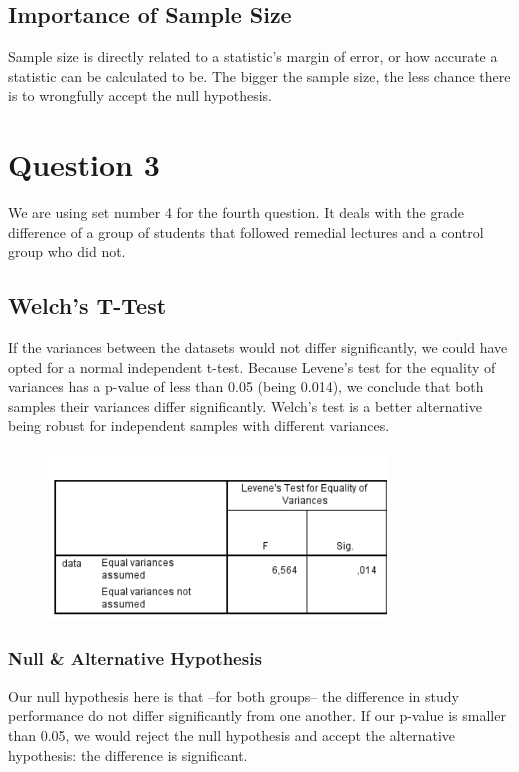 \documentclass[14]{article}
\begin{document}
\subsection{Importance of Sample Size}
Sample size is directly related to a statistic's margin of error, or how accurate a statistic can be calculated to be. The bigger the sample size, the less chance there is to wrongfully accept the null hypothesis. 

\section{Question 3}
We are using set number 4 for the fourth question. It deals with the grade difference of a group of students that followed remedial lectures and a control group who did not.

\subsection{Welch's T-Test}
If the variances between the datasets would not differ significantly, we could have opted for a normal independent t-test. Because Levene's test for the equality of variances has a p-value of less than 0.05 (being 0.014), we conclude that both samples their variances differ significantly. Welch's test is a better alternative being robust for independent samples with different variances.

\begin{figure}[!htb]
	\includegraphics[width=0.8\textwidth]{img/question3/Levene.PNG}
	\captionsetup{width=1.0\textwidth}
	\centering 
\end{figure}

\subsubsection{Null \& Alternative Hypothesis}%
Our null hypothesis here is that --for both groups-- the difference in study performance do not differ significantly from one another. If our p-value is smaller than 0.05, we would reject the null hypothesis and accept the alternative hypothesis: the difference is significant.
\end{document}
